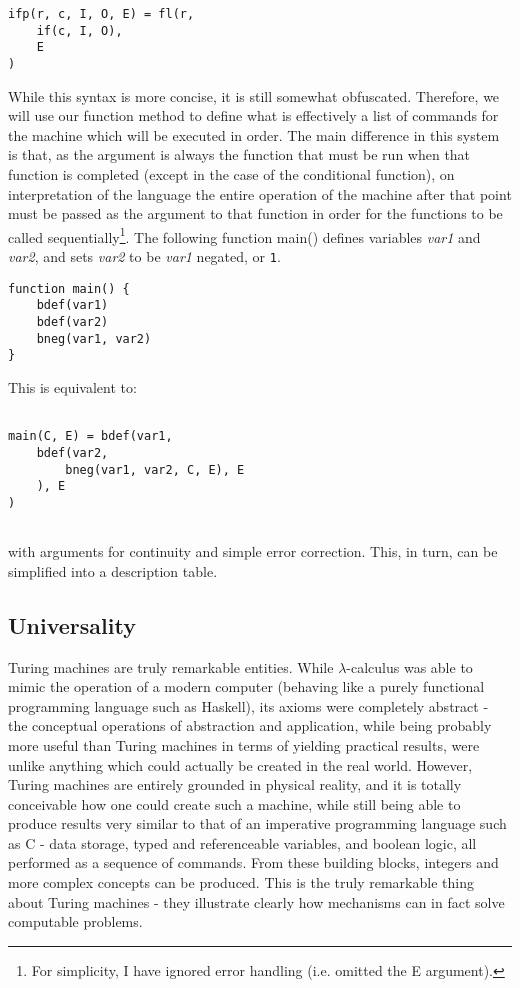 \documentclass[Master.tex]{subfiles}
\begin{document}
\begin{lstlisting}
ifp(r, c, I, O, E) = fl(r,
    if(c, I, O),
    E
)
\end{lstlisting}
While this syntax is more concise, it is still somewhat obfuscated. Therefore, we will use our function method to define what is effectively a list of commands for the machine which will be executed in order. The main difference in this system is that, as the  argument is always the function that must be run when that function is completed (except in the case of the conditional function), on interpretation of the language the entire operation of the machine after that point must be passed as the  argument to that function in order for the functions to be called sequentially\footnote{For simplicity, I have ignored error handling (i.e. omitted the E argument).}. The following function main() defines variables \textit{var1} and \textit{var2}, and sets \textit{var2} to be \textit{var1} negated, or \texttt{1}.

\begin{lstlisting}
function main() {
	bdef(var1)
	bdef(var2)
	bneg(var1, var2)
}
\end{lstlisting}
This is equivalent to:

\begin{lstlisting}

main(C, E) = bdef(var1,
    bdef(var2,
        bneg(var1, var2, C, E), E
    ), E
)


\end{lstlisting}
with arguments for continuity and simple error correction. This, in turn, can be simplified into a description table.

\subsection{Universality}

Turing machines are truly remarkable entities. While $\lambda$-calculus was able to mimic the operation of a modern computer (behaving like a purely functional programming language such as Haskell), its axioms were completely abstract - the conceptual operations of abstraction and application, while being probably more useful than Turing machines in terms of yielding practical results, were unlike anything which could actually be created in the real world. However, Turing machines are entirely grounded in physical reality, and it is totally conceivable how one could create such a machine, while still being able to produce results very similar to that of an imperative programming language such as C - data storage, typed and referenceable variables, and boolean logic, all performed as a sequence of commands. From these building blocks, integers and more complex concepts can be produced. This is the truly remarkable thing about Turing machines - they illustrate clearly how mechanisms can in fact solve computable problems. 
\end{document}
